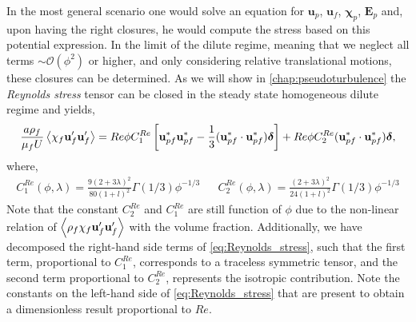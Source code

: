 In the most general scenario one would solve an equation for $\textbf{u}_p$, $\textbf{u}_f$, $\bm\chi_p$, $\textbf{E}_p$ and, upon having the right closures, he would compute the stress based on this potential expression. 
In the limit of the dilute regime, meaning that we neglect all terms $\sim \mathcal{O}(\phi^2)$ or higher, and only considering relative translational motions, these closures can be determined. 
As we will show in \ref{chap:pseudoturbulence} the \textit{Reynolds stress} tensor can be closed in the steady state homogeneous dilute regime and yields, 
\begin{equation}
    \frac{a \rho_f}{\mu_f U}\avg{\chi_f \textbf{u}_f'\textbf{u}'_f}
    = Re  \phi C^{Re}_1 \left[
        \textbf{u}_{pf}^*
        \textbf{u}_{pf}^*
        -\frac{1}{3}
        (\textbf{u}_{pf}^*
        \cdot\textbf{u}_{pf}^*)\bm\delta
    \right]
    + Re \phi C^{Re}_2 (\textbf{u}_{pf}^*\cdot\textbf{u}_{pf}^*) \bm\delta, 
    \label{eq:Reynolds_stress}
\end{equation}
where, 
\begin{align*}
    C^{Re}_1(\phi,\lambda)
    = 
        \frac{9(2+3\lambda)^2}{80(1+l)^2}\Gamma(1/3) \phi^{-1/3}
    && 
    C^{Re}_2(\phi,\lambda)
    = 
        \frac{(2+3\lambda)^2}{24(1+l)^2}\Gamma(1/3) \phi^{-1/3}
\end{align*}
Note that the constant $C^{Re}_2$ and $C^{Re}_1$ are still function of $\phi$ due to the non-linear relation of $\left<\rho_f\chi_f\textbf{u}_f'\textbf{u}'_f\right>$ with the volume fraction. 
Additionally, we have decomposed the right-hand side terms of \ref{eq:Reynolds_stress}, such that the first term, proportional to $C^{Re}_1$, corresponds to a traceless symmetric tensor, and the second term proportional to $C^{Re}_2$, represents the isotropic contribution.  
Note the constants on the left-hand side of \ref{eq:Reynolds_stress} that are present to obtain a dimensionless result proportional to $Re$. 

